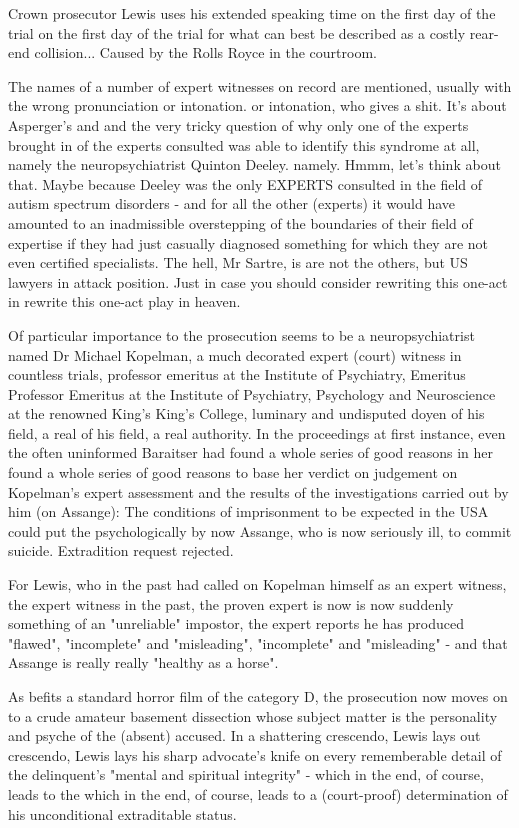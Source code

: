 \begin{multicols}{2}
Crown prosecutor Lewis uses his extended speaking time on the first day of the trial
on the first day of the trial for what can best be described
as a costly rear-end collision...
Caused by the Rolls Royce in the courtroom.

The names of a number of expert witnesses on record are mentioned, usually with the wrong pronunciation or intonation.
or intonation, who gives a shit. It's about Asperger's and
and the very tricky question of why only one of the experts brought in
of the experts consulted was able to identify this syndrome at all, namely the neuropsychiatrist Quinton Deeley.
namely. Hmmm, let's think about that. Maybe because Deeley
was the only EXPERTS consulted in the field of
autism spectrum disorders - and for all the other (experts) it would have amounted to an inadmissible overstepping of the boundaries of their field of expertise if they had just casually
diagnosed something for which they are not even certified specialists. The hell, Mr Sartre, is
are not the others, but US lawyers in attack position. Just in case you should consider rewriting this one-act in
rewrite this one-act play in heaven.

Of particular importance to the prosecution seems to be a neuropsychiatrist named Dr Michael Kopelman, a much decorated expert (court) witness in countless trials, professor emeritus at the Institute of Psychiatry, Emeritus
Professor Emeritus at the Institute of Psychiatry, Psychology and
Neuroscience at the renowned King's
King's College, luminary and undisputed doyen of his field, a real
of his field, a real authority. In the proceedings at first instance, even the often uninformed
Baraitser had found a whole series of good reasons in her
found a whole series of good reasons to base her verdict on
judgement on Kopelman's expert assessment and the results of the investigations carried out by him (on Assange): The conditions of imprisonment to be expected in the USA could put the psychologically by now
Assange, who is now seriously ill, to commit suicide. Extradition request rejected.

For Lewis, who in the past had called on Kopelman himself as an expert witness, the
expert witness in the past, the proven expert is now
is now suddenly something of an "unreliable" impostor, the expert reports he has produced "flawed", "incomplete" and "misleading",
"incomplete" and "misleading" - and that Assange is really
really "healthy as a horse".

As befits a standard horror film of the
category D, the prosecution now moves on to a crude amateur basement dissection whose subject matter is the personality and psyche of the (absent) accused. In a shattering crescendo, Lewis lays out
crescendo, Lewis lays his sharp advocate's knife on every rememberable detail of the delinquent's
"mental and spiritual integrity" - which in the end, of course, leads to the
which in the end, of course, leads to a (court-proof) determination of his
unconditional extraditable status.


\end{multicols}
